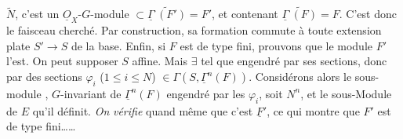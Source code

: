 \documentclass[11pt,a4paper]{article}
\begin{document}
$\widetilde{N}$, c'est un $\underline{O}_X$-$G$-module
 
$\subset \widetilde{\underline{\Gamma}^{\cdot}(F')} = F'$, et contenant
$\widetilde{\underline{\Gamma}^{\cdot}(F)} = F$.
C'est donc le  faisceau cherché. Par construction, sa
formation commute à toute extension plate $S' \to S$ de la base.
Enfin, si $F$ est de type fini,  prouvons que le
module $F'$ l'est. On peut supposer $S$ affine. Mais $\exists$ 
tel que  \struck{\ill{} \ill{}} engendré par ses sections,
 donc par des sections
$\varphi_i$ ($1 \leq i \leq N$) $\in \Gamma(S, \underline{\Gamma}^{n}(F))$.
Considérons alors le sous-module
\ill{}, \ill{} $G$-invariant de $\underline{\Gamma}^{n}(F)$ engendré par les
$\varphi_i$, soit $N^{n}$, et le sous-Module de $E$ qu'il définit.
\emph{On} \emph{vérifie} quand même que c'est $\underline{F}'$, ce qui montre
que $F'$ est de type fini\ldots\ldots
{}
\end{document}
